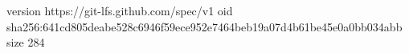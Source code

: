 version https://git-lfs.github.com/spec/v1
oid sha256:641cd805deabe528c6946f59ece952e7464beb19a07d4b61be45e0a0bb034abb
size 284
